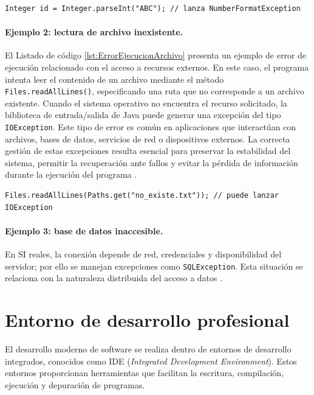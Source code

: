 \documentclass[12pt,twoside]{book}
\begin{document}
						\begin{lstlisting}[style=Java,caption={Error de ejecución: NumberFormatException.},label={lst:ErrorEjecucionNumberFormat}]
	Integer id = Integer.parseInt("ABC"); // lanza NumberFormatException \end{lstlisting}
						
						\paragraph{Ejemplo 2: lectura de archivo inexistente.} El Listado de código \ref{lst:ErrorEjecucionArchivo} presenta un ejemplo de error de ejecución relacionado con el acceso a recursos externos. En este caso, el programa intenta leer el contenido de un archivo mediante el método \texttt{Files.readAllLines()}, especificando una ruta que no corresponde a un archivo existente. Cuando el sistema operativo no encuentra el recurso solicitado, la biblioteca de entrada/salida de Java puede generar una excepción del tipo \texttt{IOException}. Este tipo de error es común en aplicaciones que interactúan con archivos, bases de datos, servicios de red o dispositivos externos. La correcta gestión de estas excepciones resulta esencial para preservar la estabilidad del sistema, permitir la recuperación ante fallos y evitar la pérdida de información durante la ejecución del programa \cite{Sommerville2015Software,Bloch2018EffectiveJava}.
						
						\begin{lstlisting}[style=Java,caption={Error de ejecución: fallo al leer archivo.},label={lst:ErrorEjecucionArchivo}]
	Files.readAllLines(Paths.get("no_existe.txt")); // puede lanzar IOException \end{lstlisting}
						
						\paragraph{Ejemplo 3: base de datos inaccesible.} En SI reales, la conexión depende de red, credenciales y disponibilidad del servidor; por ello se manejan excepciones como \texttt{SQLException}. Esta situación se relaciona con la naturaleza distribuida del acceso a datos \cite{Pressman2019Software,Sommerville2015Software}.
						
			\section{Entorno de desarrollo profesional}
				\noindent
				El desarrollo moderno de software se realiza dentro de entornos de desarrollo integrados, conocidos como IDE (\textit{Integrated Development Environment}). Estos entornos proporcionan herramientas que facilitan la escritura, compilación, ejecución y depuración de programas.
				
\end{document}
